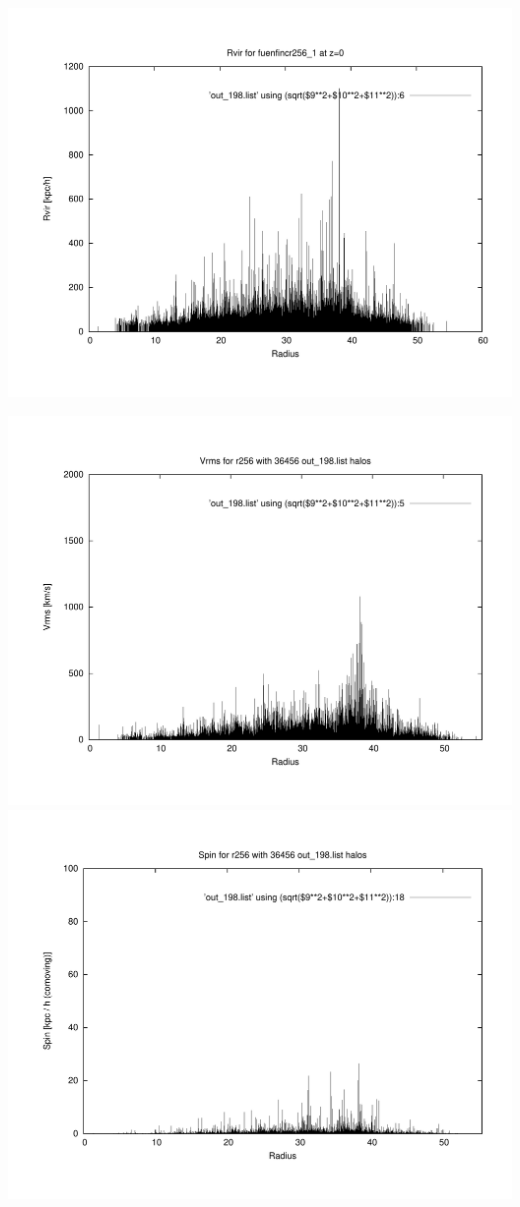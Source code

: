 \includegraphics[scale=0.3]{r256/fuenfincr256_1/plot_rvir_z0.pdf}

\includegraphics[scale=0.3]{r256/fuenfincr256_1/plot_Vrms_out_198.pdf}
\includegraphics[scale=0.3]{r256/fuenfincr256_1/plot_spin_out_198.pdf}

